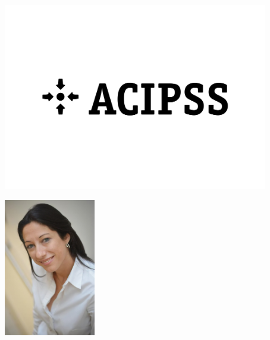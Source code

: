 \documentclass[a4paper,20pt]{article}
\begin{document}
\vfill

\begin{minipage}[t]{0.28\textwidth}
\includegraphics[width=0.87\textwidth]{acipss-gross.jpg}
\end{minipage}\hfill \includegraphics[width=0.3\textwidth]{DSC_9091-magic-1.jpg}
\end{document}
